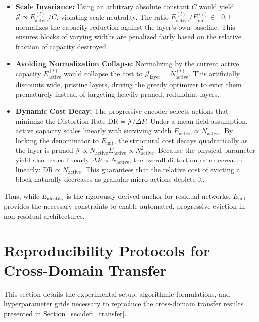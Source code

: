 \documentclass[11pt, a4paper, copyright, gdm]{google}
\newcommand{\calJ}{\mathcal{J}}
\theoremstyle{definition}
\begin{document}
\begin{itemize}
    \item \textbf{Scale Invariance:} Using an arbitrary absolute constant $C$ would yield $\calJ \propto E_{\text{active}}^{(l)}/C$, violating scale neutrality. The ratio $E_{\text{active}}^{(l)}/E_{\text{init}}^{(l)} \in [0, 1]$ normalizes the capacity reduction against the layer's own baseline. This ensures blocks of varying widths are penalized fairly based on the relative fraction of capacity destroyed.
    \item \textbf{Avoiding Normalization Collapse:} Normalizing by the current active capacity $E_{\text{active}}^{(l)}$ would collapse the cost to $\calJ_{\text{layer}} = N_{\text{active}}^{(l)}$. This artificially discounts wide, pristine layers, driving the greedy optimizer to evict them prematurely instead of targeting heavily pruned, redundant layers.
    \item \textbf{Dynamic Cost Decay:} The progressive encoder selects actions that minimize the Distortion Rate $\text{DR} = \calJ / \Delta P$. Under a mean-field assumption, active capacity scales linearly with surviving width $E_{\text{active}} \propto N_{\text{active}}$. By locking the denominator to $E_{\text{init}}$, the structural cost decays quadratically as the layer is pruned $\calJ \propto N_{\text{active}} E_{\text{active}} \propto N_{\text{active}}^2$. Because the physical parameter yield also scales linearly $\Delta P \propto N_{\text{active}}$, the overall distortion rate decreases linearly: $\text{DR} \propto N_{\text{active}}$. This guarantees that the relative cost of evicting a block naturally decreases as granular micro-actions deplete it.
\end{itemize}

Thus, while $E_{\text{identity}}$ is the rigorously derived anchor for residual networks, $E_{\text{init}}$ provides the necessary constraints to enable automated, progressive eviction in non-residual architectures.



\section{Reproducibility Protocols for Cross-Domain Transfer}
\label{app:transfer_details}

This section details the experimental setup, algorithmic formulations, and hyperparameter grids necessary to reproduce the cross-domain transfer results presented in Section~\ref{sec:deft_transfer}.
\end{document}
